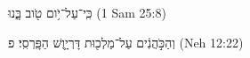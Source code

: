 
\begin{exe}

\ex\label{uponsim_exs1}
\texthebrew{
כִּֽי־עַל־יֹ֥ום טֹ֖וב בָּ֑נוּ 
} (1 Sam 25:8)

\ex\label{uponsim_exs2}
\texthebrew{
וְהַכֹּ֣הֲנִ֔ים עַל־מַלְכ֖וּת דָּרְיָ֥וֶשׁ הַפָּֽרְסִֽי׃ פ 
} (Neh 12:22)

\end{exe}
